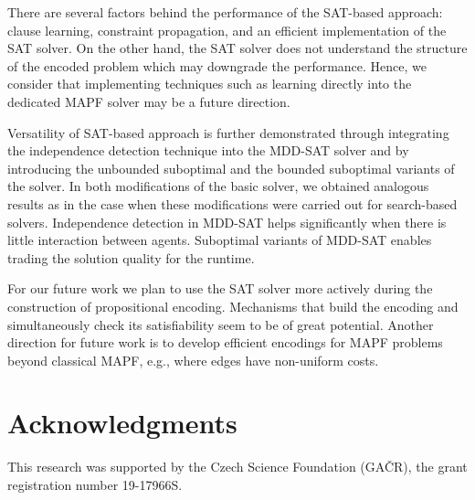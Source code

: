 \documentclass[jair,oneside,11pt]{article}
\begin{document}
There are several factors behind the performance of the SAT-based approach: clause learning, constraint propagation, and an efficient implementation of the SAT solver. On the other hand, the SAT solver does not understand the structure of the encoded problem which may downgrade the performance. Hence, we consider that implementing techniques such as learning directly into the dedicated MAPF solver may be a future direction.




Versatility of SAT-based approach is further demonstrated through integrating the independence detection technique into the MDD-SAT solver and by introducing the unbounded suboptimal and the bounded suboptimal variants of the solver. In both modifications of the basic solver, we obtained analogous results as in the case when these modifications were carried out for search-based solvers. Independence detection in MDD-SAT helps significantly when there is little interaction between agents. Suboptimal variants of MDD-SAT enables trading the solution quality for the runtime.

For our future work we plan to use the SAT solver more actively during the construction of propositional encoding. Mechanisms that build the encoding and simultaneously check its satisfiability seem to be of great potential. Another direction for future work is to develop efficient encodings for MAPF problems beyond classical MAPF, e.g., where edges have non-uniform costs. 


\section*{Acknowledgments}

This research was supported by the Czech Science Foundation (GA\v{C}R), the grant registration number 19-17966S.

\begin{small}
\end{small}



\end{document}
